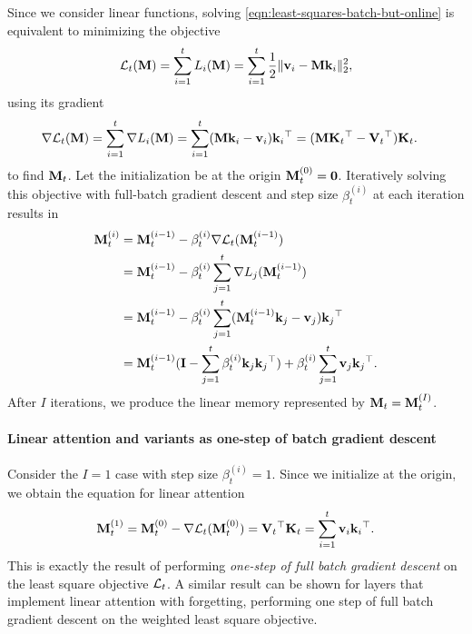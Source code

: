 \documentclass[notitlepage, 11pt]{article}
\begin{document}
Since we consider linear functions, solving \autoref{eqn:least-squares-batch-but-online} is equivalent to minimizing the objective
\begin{align}
\mathcal{L}_t(\mathbf{M}) = \sum_{i=1}^t L_i(\mathbf{M}) = \sum_{i=1}^t \frac{1}{2}\lVert\mathbf{v}_i - \mathbf{M}\mathbf{k}_i\rVert_2^2, \label{eqn:unregularized-linear-least-squares}
\end{align}
using its gradient
\begin{align}
    \nabla\mathcal{L}_t(\mathbf{M}) &= \sum_{i=1}^t \nabla L_i(\mathbf{M}) = \sum_{i=1}^t (\mathbf{M}\mathbf{k}_i - \mathbf{v}_i)\mathbf{k}_i{}^\top = (\mathbf{M}\mathbf{K}_t{}^\top - \mathbf{V}_t{}^\top)\mathbf{K}_t.
\end{align}
to find $\mathbf{M}_t$.
Let the initialization be at the origin $\mathbf{M}^{(0)}_t=\mathbf{0}$.
Iteratively solving this objective with full-batch gradient descent and step size $\beta_t^{(i)}$ at each iteration results in
\begin{align}
    \mathbf{M}^{(i)}_t &= \mathbf{M}^{(i-1)}_t - \beta_t^{(i)}\nabla\mathcal{L}_t(\mathbf{M}^{(i-1)}_t) \\
           &= \mathbf{M}^{(i-1)}_t - \beta_t^{(i)}\sum_{j=1}^t \nabla L_j(\mathbf{M}^{(i-1)}_t) \label{eqn:batch-gradient-descent}\\
           &= \mathbf{M}^{(i-1)}_t - \beta_t^{(i)}\sum_{j=1}^t (\mathbf{M}^{(i-1)}_t\mathbf{k}_j - \mathbf{v}_j)\mathbf{k}_j{}^\top \\
           &= \mathbf{M}^{(i-1)}_t(\mathbf{I} - \sum_{j=1}^t\beta_t^{(i)} \mathbf{k}_j\mathbf{k}_j{}^\top) + \beta_t^{(i)} \sum_{j=1}^t \mathbf{v}_j\mathbf{k}_j{}^\top.
\end{align}
After $I$ iterations, we produce the linear memory represented by $\mathbf{M}_t = \mathbf{M}^{(I)}_t$.

\paragraph{Linear attention and variants as one-step of batch gradient descent}
Consider the $I=1$ case with step size $\beta_t^{(i)} = 1$.
Since we initialize at the origin, we obtain the equation for linear attention 
\begin{align}
    \mathbf{M}^{(1)}_t = \mathbf{M}^{(0)}_t - \nabla\mathcal{L}_t(\mathbf{M}^{(0)}_t) = \mathbf{V}_t{}^\top\mathbf{K}_t = \sum_{i=1}^t \mathbf{v}_i \mathbf{k}_i{}^\top. \label{eqn:linear-attention-gd}
\end{align}
This is exactly the result of performing \emph{one-step of full batch gradient descent} on the least square objective $\mathcal{L}_t$. 
A similar result can be shown for layers that implement linear attention with forgetting, performing one step of full batch gradient descent on the weighted least square objective.
\end{document}
